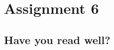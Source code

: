 \documentclass[assignments]{subfiles}
\begin{document}
\section{Assignment 6}


\subsection{Have you read well?}
\end{document}
